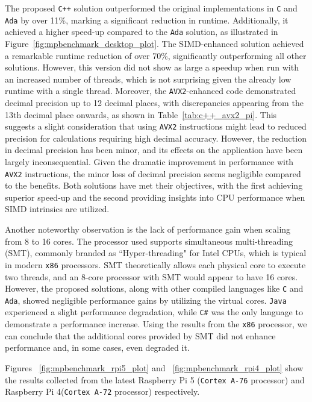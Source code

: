 The proposed \texttt{C++} solution outperformed the original implementations in \texttt{C} and \texttt{Ada} by over 11\%, marking a significant reduction in runtime. Additionally, it achieved a higher speed-up compared to the \texttt{Ada} solution, as illustrated in Figure~\ref{fig:mpbenchmark_desktop_plot}. The SIMD-enhanced solution achieved a remarkable runtime reduction of over 70\%, significantly outperforming all other solutions. However, this version did not show as large a speedup when run with an increased number of threads, which is not surprising given the already low runtime with a single thread. Moreover, the \texttt{AVX2}-enhanced code demonstrated decimal precision up to 12 decimal places, with discrepancies appearing from the 13th decimal place onwards, as shown in Table~\ref{tab:c++_avx2_pi}. This suggests a slight consideration that using \texttt{AVX2} instructions might lead to reduced precision for calculations requiring high decimal accuracy. However, the reduction in decimal precision has been minor, and its effects on the application have been largely inconsequential. Given the dramatic improvement in performance with \texttt{AVX2} instructions, the minor loss of decimal precision seems negligible compared to the benefits. Both solutions have met their objectives, with the first achieving superior speed-up and the second providing insights into CPU performance when SIMD intrinsics are utilized.

Another noteworthy observation is the lack of performance gain when scaling from 8 to 16 cores. The processor used supports simultaneous multi-threading (SMT), commonly branded as ``Hyper-threading" for Intel CPUs, which is typical in modern \texttt{x86} processors. SMT theoretically allows each physical core to execute two threads, and an 8-core processor with SMT would appear to have 16 cores. However, the proposed solutions, along with other compiled languages like \texttt{C} and \texttt{Ada}, showed negligible performance gains by utilizing the virtual cores. \texttt{Java} experienced a slight performance degradation, while \texttt{C\#} was the only language to demonstrate a performance increase. Using the results from the \texttt{x86} processor, we can conclude that the additional cores provided by SMT did not enhance performance and, in some cases, even degraded it.

Figures ~\ref{fig:mpbenchmark_rpi5_plot} and ~\ref{fig:mpbenchmark_rpi4_plot} show the results collected from the latest Raspberry Pi 5 (\texttt{Cortex A-76} processor) and Raspberry Pi 4(\texttt{Cortex A-72} processor) respectively.

